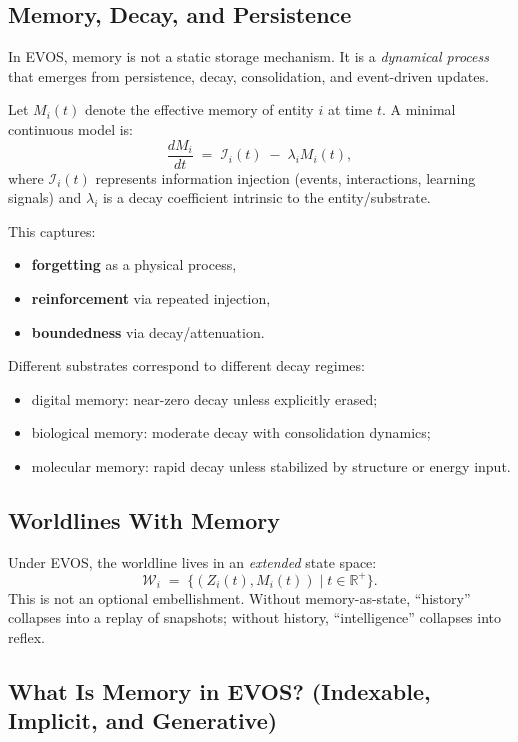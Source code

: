 \documentclass[11pt]{article}
\begin{document}
\subsection{Memory, Decay, and Persistence}

In EVOS, memory is not a static storage mechanism. It is a \emph{dynamical process} that
emerges from persistence, decay, consolidation, and event-driven updates.

Let $M_i(t)$ denote the effective memory of entity $i$ at time $t$. A minimal continuous
model is:
\[
\frac{dM_i}{dt} \;=\; \mathcal{I}_i(t) \;-\; \lambda_i M_i(t),
\]
where $\mathcal{I}_i(t)$ represents information injection (events, interactions, learning
signals) and $\lambda_i$ is a decay coefficient intrinsic to the entity/substrate.

This captures:
\begin{itemize}
  \item \textbf{forgetting} as a physical process,
  \item \textbf{reinforcement} via repeated injection,
  \item \textbf{boundedness} via decay/attenuation.
\end{itemize}

Different substrates correspond to different decay regimes:
\begin{itemize}
  \item digital memory: near-zero decay unless explicitly erased;
  \item biological memory: moderate decay with consolidation dynamics;
  \item molecular memory: rapid decay unless stabilized by structure or energy input.
\end{itemize}

\subsection{Worldlines With Memory}

Under EVOS, the worldline lives in an \emph{extended} state space:
\[
\mathcal{W}_i \;=\; \{(Z_i(t), M_i(t)) \mid t \in \mathbb{R}^+\}.
\]
This is not an optional embellishment. Without memory-as-state, ``history'' collapses
into a replay of snapshots; without history, ``intelligence'' collapses into reflex.


\subsection{What Is Memory in EVOS? (Indexable, Implicit, and Generative)}
\label{sec:evos-memory}
\end{document}
